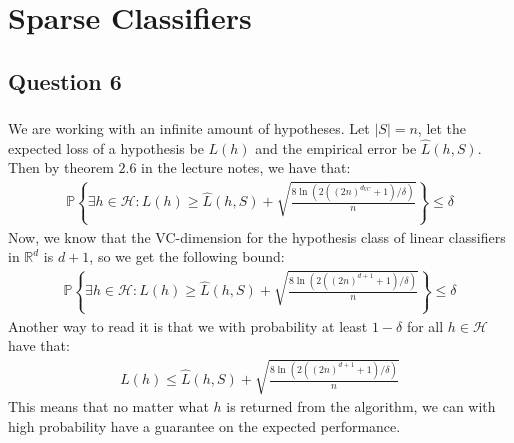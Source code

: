 \documentclass[a4paper]{article}
\begin{document}
\section{Sparse Classifiers}
\subsection{Question 6}

\subsubsection{}
We are working with an infinite amount of hypotheses. Let $|S|=n$, let the expected loss of a hypothesis be $L(h)$ and the empirical error be $\hat{L}(h,S)$. Then by theorem $2.6$ in the lecture notes, we have that:
\begin{align}\label{ineq1}
  \mathbb{P}\left\{ \exists h \in \mathcal{H}:L(h)\geq \hat{L}(h, S)+\sqrt{\frac{8\ln(2((2n)^{d_{VC}}+1)/\delta)}{n}}\right\}\leq \delta
\end{align}
Now, we know that the VC-dimension for the hypothesis class of linear classifiers in $\mathbb{R}^d$ is $d+1$, so we get the following bound:
\begin{align*}
  \mathbb{P}\left\{ \exists h \in \mathcal{H}:L(h)\geq \hat{L}(h, S)+\sqrt{\frac{8\ln(2((2n)^{d+1}+1)/\delta)}{n}}\right\}\leq \delta
\end{align*}
Another way to read it is that we with probability at least $1-\delta$ for all $h\in\mathcal{H}$ have that:
\begin{align*}
  L(h)\leq \hat{L}(h,S)+\sqrt{\frac{8\ln(2((2n)^{d+1}+1)/\delta)}{n}}
\end{align*}
This means that no matter what $h$ is returned from the algorithm, we can with high probability have a guarantee on the expected performance.
\end{document}
